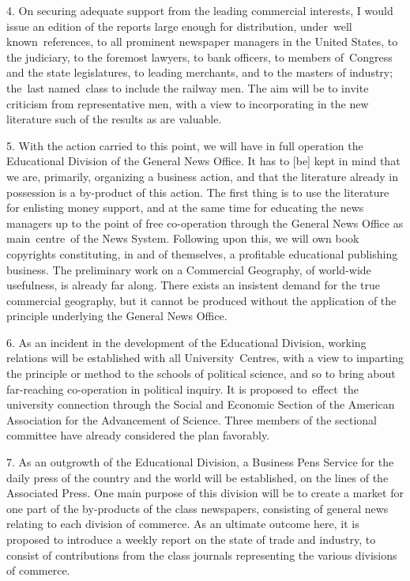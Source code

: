 \documentclass[openany,nobib]{tufte-book}
\begin{document}
4. On securing adequate support from the leading commercial interests, I
would issue an edition of the reports large enough for distribution,
under~well known~references, to all prominent newspaper managers in the
United States, to the judiciary, to the foremost lawyers, to bank
officers, to members of~Congress and the state legislatures, to leading
merchants, and to the masters of industry; the~last named~class to
include the railway men. The aim will be to invite criticism from
representative men, with a view to incorporating in the new literature
such of the results as are valuable.~

5. With the action carried to this point, we will have in full operation
the Educational Division of the General News Office. It has to {[}be{]}
kept in mind that we are, primarily, organizing a business action, and
that the literature already in possession is a by-product of this
action. The first thing is to use the literature for enlisting money
support, and at the same time for educating the news managers up to the
point of free co-operation through the General News Office as
main~centre~of the News System. Following upon this, we will own book
copyrights constituting, in and of themselves, a profitable educational
publishing business. The preliminary work on a Commercial Geography, of
world-wide usefulness, is already far along. There exists an insistent
demand for the true commercial geography, but it cannot be produced
without the application of the principle underlying the General News
Office.~

6. As an incident in the development of the Educational Division,
working relations will be established with all University~Centres, with
a view to imparting the principle or method to the schools of political
science, and so to bring about far-reaching co-operation in political
inquiry. It is proposed to~effect~the university connection through the
Social and Economic Section of the American Association for the
Advancement of Science. Three members of the sectional committee have
already considered the plan favorably.~

7. As an outgrowth of the Educational Division, a Business Pens Service
for the daily press of the country and the world will be established, on
the lines of the Associated Press. One main purpose of this division
will be to create a market for one part of the by-products of the class
newspapers, consisting of general news relating to each division of
commerce. As an ultimate outcome here, it is proposed to introduce a
weekly report on the state of trade and industry, to consist of
contributions from the class journals representing the various divisions
of commerce. ~
\end{document}
